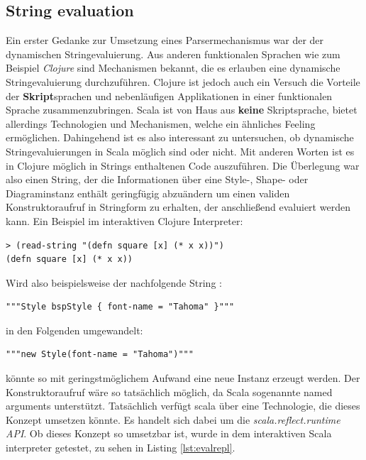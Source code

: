 \subsection{String evaluation}Ein erster Gedanke zur Umsetzung eines Parsermechanismus war der der dynamischen Stringevaluierung. Aus anderen funktionalen Sprachen wie zum Beispiel \textit{Clojure} sind Mechanismen bekannt, die es erlauben eine dynamische Stringevaluierung durchzuführen. Clojure ist jedoch auch ein Versuch die Vorteile der \textbf{Skript}sprachen und nebenläufigen Applikationen in einer funktionalen Sprache zusammenzubringen. Scala ist von Haus aus \textbf{keine} Skriptsprache, bietet allerdings Technologien und Mechanismen, welche ein ähnliches Feeling ermöglichen. Dahingehend ist es also interessant zu untersuchen, ob dynamische Stringevaluierungen in Scala möglich sind oder nicht. Mit anderen Worten ist es in Clojure möglich in Strings enthaltenen Code auszuführen. Die Überlegung war also einen String, der die Informationen über eine Style-, Shape- oder Diagraminstanz enthält geringfügig abzuändern um einen validen Konstruktoraufruf in Stringform zu erhalten, der anschließend evaluiert werden kann.
Ein Beispiel im interaktiven Clojure Interpreter:
\begin{lstlisting}[style=spray]
> (read-string "(defn square [x] (* x x))")
(defn square [x] (* x x))
\end{lstlisting}Wird also beispielsweise der nachfolgende String	:
\begin{lstlisting}[style=scala, aboveskip=0pt]
"""Style bspStyle { font-name = "Tahoma" }"""
\end{lstlisting}in den Folgenden umgewandelt:
\begin{lstlisting}[style=scala, aboveskip=0pt]
"""new Style(font-name = "Tahoma")"""
\end{lstlisting}könnte so mit geringstmöglichem Aufwand eine neue Instanz erzeugt werden. Der Konstruktoraufruf wäre so tatsächlich möglich, da Scala sogenannte named arguments unterstützt.
Tatsächlich verfügt scala über eine Technologie, die dieses Konzept umsetzen könnte. Es handelt sich dabei um die \textit{scala.reflect.runtime API}.
Ob dieses Konzept so umsetzbar ist, wurde in dem interaktiven Scala interpreter getestet, zu sehen in  Listing \ref{lst:evalrepl}.
